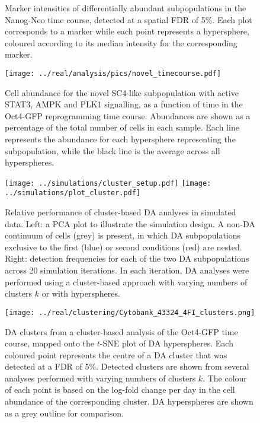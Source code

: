 \documentclass{article}
\begin{document}
\begin{figure}[p]
    \begin{center}
    \end{center}
    \caption{
        Marker intensities of differentially abundant subpopulations in the Nanog-Neo time course, detected at a spatial FDR of 5\%.
        Each plot corresponds to a marker while each point represents a hypersphere, coloured according to its median intensity for the corresponding marker.
    }
\end{figure}

\begin{figure}[p]
    \begin{center}
        \texttt{[image: ../real/analysis/pics/novel\_timecourse.pdf]}
    \end{center}
    \caption{
        Cell abundance for the novel SC4-like subpopulation with active STAT3, AMPK and PLK1 signalling, as a function of time in the Oct4-GFP reprogramming time course.
        Abundances are shown as a percentage of the total number of cells in each sample.
        Each line represents the abundance for each hypersphere representing the subpopulation, while the black line is the average across all hyperspheres.
    }
\end{figure}

\begin{figure}[p]
\begin{center}
\texttt{[image: ../simulations/cluster\_setup.pdf]}
\texttt{[image: ../simulations/plot\_cluster.pdf]}
\end{center}
\caption{Relative performance of cluster-based DA analyses in simulated data.
    Left: a PCA plot to illustrate the simulation design.
    A non-DA continuum of cells (grey) is present, in which DA subpopulations exclusive to the first (blue) or second conditions (red) are nested.
    Right: detection frequencies for each of the two DA subpopulations across 20 simulation iterations.
    In each iteration, DA analyses were performed using a cluster-based approach with varying numbers of clusters $k$ or with hyperspheres.
}
\label{fig:clustersim}
\end{figure}

\begin{figure}[p]
\begin{center}
\texttt{[image: ../real/clustering/Cytobank\_43324\_4FI\_clusters.png]}
\end{center}
\caption{DA clusters from a cluster-based analysis of the Oct4-GFP time course, mapped onto the $t$-SNE plot of DA hyperspheres.
Each coloured point represents the centre of a DA cluster that was detected at a FDR of 5\%.
Detected clusters are shown from several analyses performed with varying numbers of clusters $k$.
The colour of each point is based on the log-fold change per day in the cell abundance of the corresponding cluster.
DA hyperspheres are shown as a grey outline for comparison.
}
\end{figure}
\end{document}
